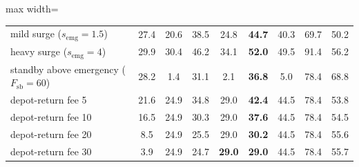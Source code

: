 \begin{table}[t]
\begin{adjustbox}{max width=\linewidth}
\begin{tabular}{l cccccc cc}
mild surge ($s_{\mathrm{emg}}{=}1.5$) & 27.4 & 20.6 & 38.5 & 24.8 & \textbf{44.7} & 40.3 & 69.7 & 50.2 \\
heavy surge ($s_{\mathrm{emg}}{=}4$) & 29.9 & 30.4 & 46.2 & 34.1 & \textbf{52.0} & 49.5 & 91.4 & 56.2 \\
standby above emergency ($F_{\mathrm{sb}}{=}60$) & 28.2 & 1.4 & 31.1 & 2.1 & \textbf{36.8} & 5.0 & 78.4 & 68.8 \\
\midrule
depot-return fee 5 & 21.6 & 24.9 & 34.8 & 29.0 & \textbf{42.4} & 44.5 & 78.4 & 53.8 \\
depot-return fee 10 & 16.5 & 24.9 & 30.3 & 29.0 & \textbf{37.6} & 44.5 & 78.4 & 54.5 \\
depot-return fee 20 & 8.5 & 24.9 & 25.5 & 29.0 & \textbf{30.2} & 44.5 & 78.4 & 55.6 \\
depot-return fee 30 & 3.9 & 24.9 & 24.7 & \textbf{29.0} & \textbf{29.0} & 44.5 & 78.4 & 55.7 \\
\bottomrule
\end{tabular}
\end{adjustbox}
\end{table}
